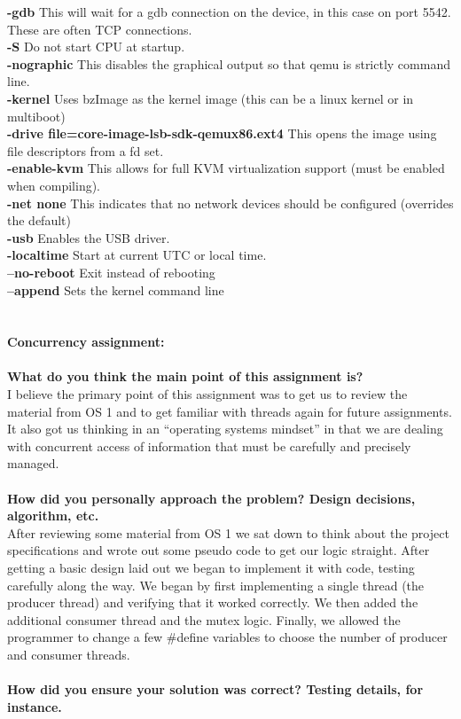 \documentclass[10pt]{article}
\begin{document}
\textbf{-gdb} This will wait for a gdb connection on the device, in this case on port 5542. These are often TCP connections.\\
\textbf{-S} Do not start CPU at startup.\\
\textbf{-nographic} This disables the graphical output so that qemu is strictly command line.\\
\textbf{-kernel} Uses bzImage as the kernel image (this can be a linux kernel or in multiboot)\\
\textbf{-drive file=core-image-lsb-sdk-qemux86.ext4} This opens the image using file descriptors from a fd set.\\
\textbf{-enable-kvm} This allows for full KVM virtualization support (must be enabled when compiling).\\
\textbf{-net none} This indicates that no network devices should be configured (overrides the default)\\
\textbf{-usb} Enables the USB driver.\\
\textbf{-localtime} Start at current UTC or local time.\\
\textbf{--no-reboot} Exit instead of rebooting\\
\textbf{--append}  Sets the kernel command line\\\\\\
\textbf{Concurrency assignment:}\\\\
\textbf{What do you think the main point of this assignment is?}\\

I believe the primary point of this assignment was to get us to review the material from OS 1 and to get familiar with threads again for future assignments. It also got us thinking in an “operating systems mindset” in that we are dealing with concurrent access of information that must be carefully and precisely managed.\\\\
\textbf{How did you personally approach the problem? Design decisions, algorithm, etc.}\\

After reviewing some material from OS 1 we sat down to think about the project specifications and wrote out some pseudo code to get our logic straight. After getting a basic design laid out we began to implement it with code, testing carefully along the way. We began by first implementing a single thread (the producer thread) and verifying that it worked correctly. We then added the additional consumer thread and the mutex logic. Finally, we allowed the programmer to change a few \#define variables to choose the number of producer and consumer threads.\\\\
\textbf{How did you ensure your solution was correct? Testing details, for instance.}\\
\end{document}

